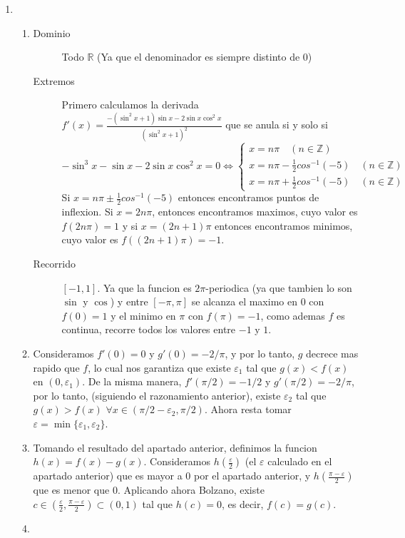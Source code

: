 \documentclass{article}
\newcommand{\R}{\mathbb{R}}
\begin{document}
\begin{enumerate}
\begin{enumerate}
\end{enumerate}
\item \begin{enumerate}
\item \begin{description}
\item [Dominio] Todo $\R$ (Ya que el denominador es siempre distinto de 0)
\item [Extremos] Primero calculamos la derivada
$\displaystyle f'(x) = \frac{-(\sin^2x+1)\sin x - 2\sin x \cos^2x}{(\sin^2 x + 1)^2}$ que se anula
si y solo si 
\[
-\sin^3x - \sin x - 2\sin x \cos^2x = 0 \iff
\begin{cases}
x = n\pi \quad (n \in \mathbb{Z}) \\
x = n\pi - \frac{1}{2}cos^{-1}(-5) \quad (n \in \mathbb{Z}) \\
x = n\pi + \frac{1}{2}cos^{-1}(-5) \quad (n \in \mathbb{Z})
\end{cases}
\]
Si $x = n\pi \pm \frac{1}{2}cos^{-1}(-5)$ entonces encontramos puntos de inflexion. Si $x = 2n\pi$,
entonces encontramos maximos, cuyo valor es $f(2n\pi) = 1$ y si $x = (2n+1)\pi$ entonces
encontramos minimos, cuyo valor es $f((2n+1)\pi) = -1$.
\item [Recorrido] $[-1,1]$. Ya que la funcion es $2\pi$-periodica (ya que tambien lo son $\sin$ y
$\cos$) y entre $[-\pi,\pi]$ se alcanza el maximo en $0$ con $f(0) = 1$ y el minimo en $\pi$ con
$f(\pi) = -1$, como ademas $f$ es continua, recorre todos los valores entre $-1$ y $1$. 
\end{description}
\item Consideramos $f'(0) = 0$ y $g'(0) = -2/\pi$, y por lo tanto, $g$ decrece mas rapido que $f$,
lo cual nos garantiza que existe $\varepsilon_1$ tal que $g(x) < f(x)$ en $(0,\varepsilon_1)$. De
la misma manera, $f'(\pi/2) = -1/2$ y $g'(\pi/2) = -2/\pi$, por lo tanto, (siguiendo el razonamiento
anterior), existe $\varepsilon_2$ tal que $g(x)>f(x)$ $\forall x \in (\pi/2-\varepsilon_2, \pi/2)$.
Ahora resta tomar $\varepsilon = \min \{\varepsilon_1, \varepsilon_2 \}$.
\item Tomando el resultado del apartado anterior, definimos la funcion $h(x) = f(x) - g(x)$.
Consideramos $h\left( \frac{\varepsilon}{2} \right)$ (el $\varepsilon$ calculado en el apartado
anterior) que es mayor a 0 por el apartado anterior, y $h \left(\frac{\pi-\varepsilon}{2} \right)$
que es menor que 0. Aplicando ahora Bolzano, existe
$c \in \left( \frac{\varepsilon}{2}, \frac{\pi - \varepsilon}{2} \right) \subset (0,1)$ tal que $h(c)=0$,
es decir, $f(c) = g(c)$.
\item 
\end{enumerate}
\end{enumerate}
\end{document}
